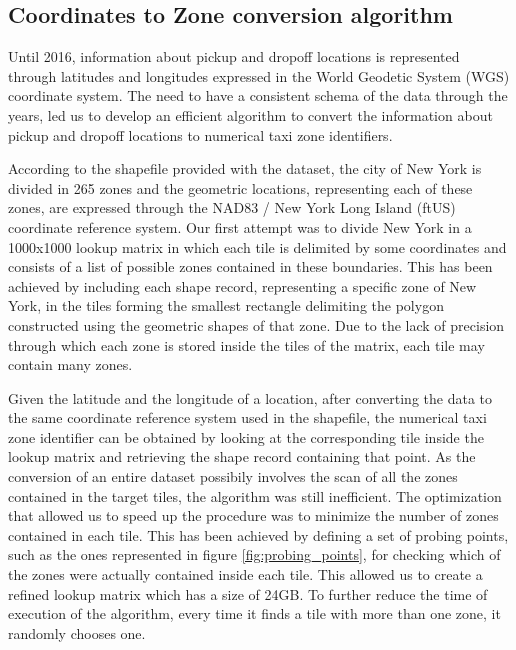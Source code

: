 \documentclass{acm_proc_article-sp-sigmod09}
\begin{document}
\subsection{Coordinates to Zone conversion algorithm}

Until 2016, information about pickup and dropoff locations is represented through latitudes and longitudes expressed in the World Geodetic System (WGS) coordinate system. The need to have a consistent schema of the data through the years, led us to develop an efficient algorithm to convert the information about pickup and dropoff locations to numerical taxi zone identifiers. 

According to the shapefile provided with the dataset, the city of New York is divided in 265 zones and the geometric locations, representing each of these zones, are expressed through the NAD83 / New York Long Island (ftUS) coordinate reference system. Our first attempt was to divide New York in a 1000x1000 lookup matrix in which each tile is delimited by some coordinates and consists of a list of possible zones contained in these boundaries. This has been achieved by including each shape record, representing a specific zone of New York, in the tiles forming the smallest rectangle delimiting the polygon constructed using the geometric shapes of that zone. Due to the lack of precision through which each zone is stored inside the tiles of the matrix, each tile may contain many zones.

Given the latitude and the longitude of a location, after converting the data to the same coordinate reference system used in the shapefile, the numerical taxi zone identifier can be obtained by looking at the corresponding tile inside the lookup matrix and retrieving the shape record containing that point. As the conversion of an entire dataset possibily involves the scan of all the zones contained in the target tiles, the algorithm was still inefficient. The optimization that allowed us to speed up the procedure was to minimize the number of zones contained in each tile. This has been achieved by defining a set of probing points, such as the ones represented in figure \ref{fig:probing_points}, for checking which of the zones were actually contained inside each tile. This allowed us to create a refined lookup matrix which has a size of 24GB. To further reduce the time of execution of the algorithm, every time it finds a tile with more than one zone, it randomly chooses one.
\end{document}

